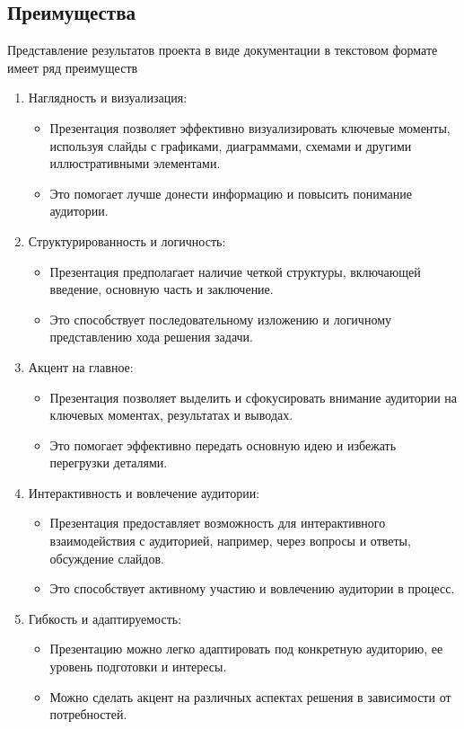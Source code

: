     \subsection{Преимущества}
    Представление результатов проекта в виде документации в текстовом формате имеет ряд преимуществ

    \begin{enumerate}
    \item Наглядность и визуализация:
        \begin{itemize}
            \item Презентация позволяет эффективно визуализировать ключевые моменты, используя слайды с графиками, диаграммами, схемами и другими иллюстративными элементами.
            \item Это помогает лучше донести информацию и повысить понимание аудитории.
        \end{itemize}
    \item Структурированность и логичность:
        \begin{itemize}
            \item Презентация предполагает наличие четкой структуры, включающей введение, основную часть и заключение.
            \item Это способствует последовательному изложению и логичному представлению хода решения задачи.
        \end{itemize}
    \item Акцент на главное:
        \begin{itemize}
            \item Презентация позволяет выделить и сфокусировать внимание аудитории на ключевых моментах, результатах и выводах.
            \item Это помогает эффективно передать основную идею и избежать перегрузки деталями.
        \end{itemize}
    \item Интерактивность и вовлечение аудитории:
        \begin{itemize}
            \item Презентация предоставляет возможность для интерактивного взаимодействия с аудиторией, например, через вопросы и ответы, обсуждение слайдов.
            \item Это способствует активному участию и вовлечению аудитории в процесс.
        \end{itemize}
    \item Гибкость и адаптируемость:
        \begin{itemize}
            \item Презентацию можно легко адаптировать под конкретную аудиторию, ее уровень подготовки и интересы.
            \item Можно сделать акцент на различных аспектах решения в зависимости от потребностей.
        \end{itemize}
    \end{enumerate}

